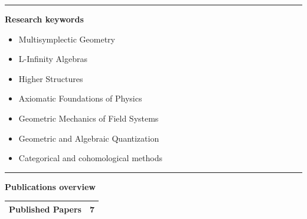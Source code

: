 \documentclass[a4paper]{article}
\newcommand{\block}[1]{\hrule \vspace{0.2cm} \textbf{\Large #1} \vspace{0.2cm}}
\begin{document}
\hfill
\begin{minipage}[t]{0.375\columnwidth}


    \block{Research keywords}
    
    \begin{itemize}[leftmargin=*, itemsep=0pt, parsep=0pt, topsep=0pt, partopsep=0pt]
    
    \item[$\cdot$] Multisymplectic Geometry
    
    \item[$\cdot$] L-Infinity Algebras
    
    \item[$\cdot$] Higher Structures
    
    \item[$\cdot$] Axiomatic Foundations of Physics
    
    \item[$\cdot$] Geometric Mechanics of Field Systems
    
    \item[$\cdot$] Geometric and Algebraic Quantization
    
    \item[$\cdot$] Categorical and cohomological methods
    
    \end{itemize}
    \vspace{1em}





    \block{Publications overview} 
    
    \begin{tabularx}{\linewidth}{|X|c|}
    \hline
    
    Published Papers & 7 \\
    \hline
    

\end{tabularx}
\end{minipage}
\end{document}
